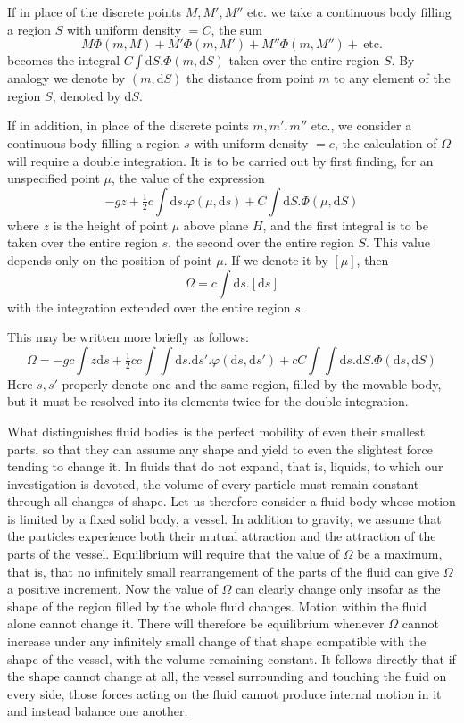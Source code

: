 If in place of the discrete points $M,M',M''$ etc. we take a continuous body filling a region $S$ with uniform density $=C$, the sum
\[
M\Phi(m,M)+M'\Phi(m,M')+M''\Phi(m,M'')+\ \text{etc.}
\]
becomes the integral $C\int\mathrm{d}S.\Phi(m,\mathrm{d}S)$ taken over the entire region $S$. By analogy we denote by $(m,\mathrm{d}S)$ the distance from point $m$ to any element of the region $S$, denoted by $\mathrm{d}S$.

If in addition, in place of the discrete points $m,m',m''$ etc., we consider a continuous body filling a region $s$ with uniform density $=c$, the calculation of $\Omega$ will require a double integration. It is to be carried out by first finding, for an unspecified point $\mu$, the value of the expression
\[
-gz+\tfrac12c\int\mathrm{d}s.\varphi(\mu,\mathrm{d}s)+C\int\mathrm{d}S.\Phi(\mu,\mathrm{d}S)
\]
where $z$ is the height of point $\mu$ above plane $H$, and the first integral is to be taken over the entire region $s$, the second over the entire region $S$. This value depends only on the position of point $\mu$. If we denote it by $[\mu]$, then
\[
\Omega=c\int\mathrm{d}s.[\mathrm{d}s]
\]
with the integration extended over the entire region $s$.

This may be written more briefly as follows:
\[
\Omega=-gc\int z\mathrm{d}s+\tfrac12cc\int\int\mathrm{d}s.\mathrm{d}s'.\varphi(\mathrm{d}s,\mathrm{d}s')+cC\int\int\mathrm{d}s.\mathrm{d}S.\Phi(\mathrm{d}s,\mathrm{d}S)
\]
Here $s,s'$ properly denote one and the same region, filled by the movable body, but it must be resolved into its elements twice for the double integration.

What distinguishes fluid bodies is the perfect mobility of even their smallest parts, so that they can assume any shape and yield to even the slightest force tending to change it. In fluids that do not expand, that is, liquids, to which our investigation is devoted, the volume of every particle must remain constant through all changes of shape. Let us therefore consider a fluid body whose motion is limited by a fixed solid body, a vessel. In addition to gravity, we assume that the particles experience both their mutual attraction and the attraction of the parts of the vessel. Equilibrium will require that the value of $\Omega$ be a maximum, that is, that no infinitely small rearrangement of the parts of the fluid can give $\Omega$ a positive increment. Now the value of $\Omega$ can clearly change only insofar as the shape of the region filled by the whole fluid changes. Motion within the fluid alone cannot change it. There will therefore be equilibrium whenever $\Omega$ cannot increase under any infinitely small change of that shape compatible with the shape of the vessel, with the volume remaining constant. It follows directly that if the shape cannot change at all, the vessel surrounding and touching the fluid on every side, those forces acting on the fluid cannot produce internal motion in it and instead balance one another.

